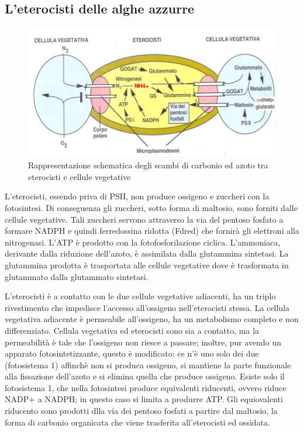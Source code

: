 \documentclass[a4paper,12pt]{book}
\begin{document}
\subsection{L'eterocisti delle alghe azzurre}
\begin{figure}[H]
\centering
\includegraphics[scale=0.35]{immagini/eterocisti.jpg}
\caption{Rappresentazione schematica degli scambi di carbonio ed azoto tra eterocisti e cellule vegetative}
\end{figure}
 L’eterocisti, essendo priva di PSII, non produce ossigeno e zuccheri con la fotosintesi. Di conseguenza gli zuccheri, sotto forma di maltosio, sono forniti dalle cellule vegetative. Tali zuccheri servono attraverso la via del pentoso fosfato a formare NADPH e quindi ferredossina ridotta (Fdred) che fornirà gli elettroni alla nitrogenasi. L’ATP è prodotto con la fotofosforilazione ciclica. L’ammoniaca, derivante dalla riduzione dell’azoto, è assimilata dalla glutammina sintetasi.
La glutammina prodotta è trasportata alle cellule vegetative dove è trasformata in glutammato dalla glutammato
sintetasi.

L'eterocisti è a contatto con le due cellule vegetative adiacenti, ha un triplo rivestimento che impedisce l'accesso all'ossigeno nell'eterocisti stessa. La cellula vegetativa adiacente è permeabile all'ossigeno, ha un metabolismo completo e non differenziato. Cellula vegetativa ed eterocisti sono sia a contatto, ma la permeabilità è tale che l'ossigeno non riesce a passare; inoltre, pur avendo un apparato fotosintetizzante, questo è modificato: ce n'è uno solo dei due (fotosistema 1) affinchè non si produca ossigeno, si mantiene la parte funzionale alla fissazione dell'azoto e si elimina quella che produce ossigeno. Esiste solo il fotosistema 1, che nella fotosintesi produce equivalenti riducenti, ovvero riduce NADP+ a NADPH; in questo caso si limita a produrre ATP. Gli equiovalenti riducento sono prodotti dlla via dei pentoso fosfati a partire dal maltosio, la forma di carbonio organicata che viene trasferita all'eterocisti ed ossidata.
\end{document}
